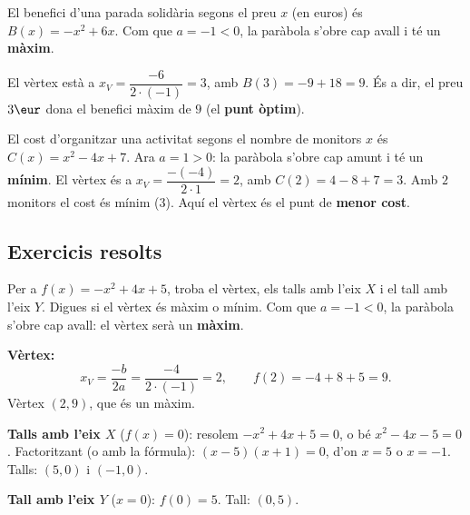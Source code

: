 \begin{exemple}
El benefici d'una parada solidària segons el preu $x$ (en euros) és
$B(x)=-x^2+6x$. Com que $a=-1<0$, la paràbola s'obre cap avall i té un \textbf{màxim}.

\begin{center}

\end{center}

\noindent El vèrtex està a $x_V=\dfrac{-6}{2\cdot(-1)}=3$, amb $B(3)=-9+18=9$. És a dir,
el preu $3\eur$ dona el benefici màxim de $9$ (el \textbf{punt òptim}).
\end{exemple}

\begin{exemple}
El cost d'organitzar una activitat segons el nombre de monitors $x$ és
$C(x)=x^2-4x+7$. Ara $a=1>0$: la paràbola s'obre cap amunt i té un \textbf{mínim}.
El vèrtex és a $x_V=\dfrac{-(-4)}{2\cdot 1}=2$, amb $C(2)=4-8+7=3$. Amb $2$ monitors
el cost és mínim ($3$). Aquí el vèrtex és el punt de \textbf{menor cost}.
\end{exemple}

\subsection{Exercicis resolts}

\begin{exresolt}
Per a $f(x)=-x^2+4x+5$, troba el vèrtex, els talls amb l'eix $X$ i el tall amb
l'eix $Y$. Digues si el vèrtex és màxim o mínim.
\solucio
Com que $a=-1<0$, la paràbola s'obre cap avall: el vèrtex serà un \textbf{màxim}.

\textbf{Vèrtex:}
\[
x_V=\frac{-b}{2a}=\frac{-4}{2\cdot(-1)}=2,\qquad
f(2)=-4+8+5=9.
\]
Vèrtex $(2,9)$, que és un màxim.

\textbf{Talls amb l'eix $X$} ($f(x)=0$): resolem $-x^2+4x+5=0$, o bé
$x^2-4x-5=0$. Factoritzant (o amb la fórmula): $(x-5)(x+1)=0$, d'on $x=5$ o $x=-1$.
Talls: $(5,0)$ i $(-1,0)$.

\textbf{Tall amb l'eix $Y$} ($x=0$): $f(0)=5$. Tall: $(0,5)$.
\end{exresolt}

